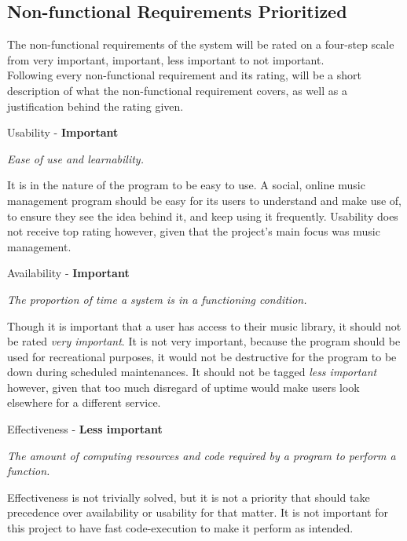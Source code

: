 \subsection{Non-functional Requirements Prioritized}

The non-functional requirements of the system will be rated on a four-step scale
from very important, important, less important to not important.
\\
Following every non-functional requirement and its rating, will be a short description of
what the non-functional requirement covers, as well as a justification behind the rating
given.
\newpage

\noindent
Usability - \textbf{Important}

\vspace{5 mm}
\noindent
\textit{Ease of use and learnability.}

\vspace{5 mm}

\noindent
It is in the nature of the program to be easy to use. A social, online music management
program should be easy for its users to understand and make use of, to ensure they see the
idea behind it, and keep using it frequently. Usability does not receive top rating
however, given that the project's main focus was music management.

\vspace{5 mm}
\noindent
Availability - \textbf{Important}

\vspace{5 mm}
\noindent
\textit{The proportion of time a system is in a functioning condition.}

\vspace{5 mm}
\noindent
Though it is important that a user has access to their music library, it should not be
rated \textit{very important}. It is not very important, because the program
should be used for recreational purposes, it would not be destructive for the program to be down during
scheduled maintenances. It should not be tagged \textit{less important} however,
given that too much disregard of uptime would make users look elsewhere for a different service.

\vspace{5 mm}
\noindent
Effectiveness - \textbf{Less important}

\vspace{5 mm}
\noindent
\textit{The amount of computing resources and code required by a program to perform a
function.}

\vspace{5 mm}
\noindent
Effectiveness is not trivially solved, but it is not a priority that should take precedence
over availability or usability for that matter. It is not important for this project to
have fast code-execution to make it perform as intended.


